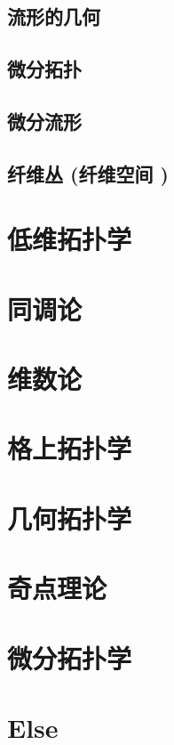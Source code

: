 \documentclass[UTF8]{../09-Mathematics}
\begin{document}
    \section{流形的几何}
    \section{微分拓扑}
    \section{微分流形}
    \section{纤维丛 (纤维空间 )}



\chapter{低维拓扑学}
\chapter{同调论}
\chapter{维数论}
\chapter{格上拓扑学}

\chapter{几何拓扑学}
\chapter{奇点理论}
\chapter{微分拓扑学}
\chapter{Else}
\end{document}

